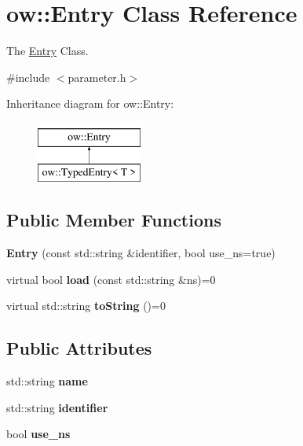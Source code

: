 \hypertarget{classow_1_1Entry}{}\section{ow\+:\+:Entry Class Reference}
\label{classow_1_1Entry}


The \hyperlink{classow_1_1Entry}{Entry} Class.  




{\ttfamily \#include $<$parameter.\+h$>$}

Inheritance diagram for ow\+:\+:Entry\+:\begin{figure}[H]
\begin{center}
\leavevmode
\includegraphics[height=2.000000cm]{d4/d87/classow_1_1Entry}
\end{center}
\end{figure}
\subsection*{Public Member Functions}
\begin{DoxyCompactItemize}
\item 
{\bfseries Entry} (const std\+::string \&identifier, bool use\+\_\+ns=true)\hypertarget{classow_1_1Entry_aa098c6fce458a099ae468d6398054bcb}{}\label{classow_1_1Entry_aa098c6fce458a099ae468d6398054bcb}

\item 
virtual bool {\bfseries load} (const std\+::string \&ns)=0\hypertarget{classow_1_1Entry_a3c93a8a947db8641b4f5671b218a337b}{}\label{classow_1_1Entry_a3c93a8a947db8641b4f5671b218a337b}

\item 
virtual std\+::string {\bfseries to\+String} ()=0\hypertarget{classow_1_1Entry_a430aa729a79bee80ed34c05bef0fa452}{}\label{classow_1_1Entry_a430aa729a79bee80ed34c05bef0fa452}

\end{DoxyCompactItemize}
\subsection*{Public Attributes}
\begin{DoxyCompactItemize}
\item 
std\+::string {\bfseries name}\hypertarget{classow_1_1Entry_a281e933befe8c66e959247ecf1319059}{}\label{classow_1_1Entry_a281e933befe8c66e959247ecf1319059}

\item 
std\+::string {\bfseries identifier}\hypertarget{classow_1_1Entry_aabeaf6a0ade7eb10ae75a010eb78c02e}{}\label{classow_1_1Entry_aabeaf6a0ade7eb10ae75a010eb78c02e}

\item 
bool {\bfseries use\+\_\+ns}\hypertarget{classow_1_1Entry_a8a2f7d58c27793ad8fcf59464a63adaf}{}\label{classow_1_1Entry_a8a2f7d58c27793ad8fcf59464a63adaf}

\end{DoxyCompactItemize}


